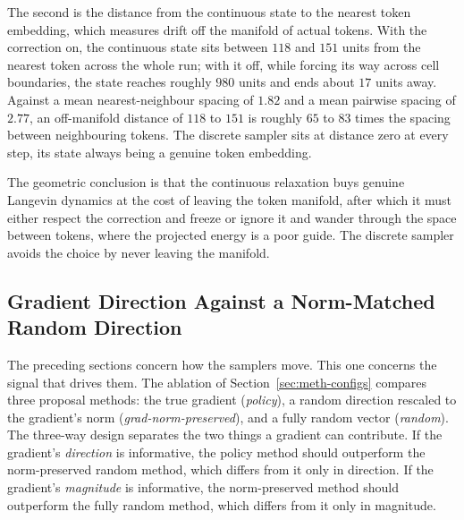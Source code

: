 The second is the distance from the continuous state to the nearest token embedding, which measures drift off the manifold of actual tokens. With the correction on, the continuous state sits between $118$ and $151$ units from the nearest token across the whole run; with it off, while forcing its way across cell boundaries, the state reaches roughly $980$ units and ends about $17$ units away.
Against a mean nearest-neighbour spacing of $1.82$ and a mean pairwise spacing of $2.77$, an off-manifold distance of $118$ to $151$ is roughly $65$ to $83$ times the spacing between neighbouring tokens. The discrete sampler sits at distance zero at every step, its state always being a genuine token embedding.

The geometric conclusion is that the continuous relaxation buys genuine Langevin dynamics at the cost of leaving the token manifold, after which it must either respect the correction and freeze or ignore it and wander through the space between tokens, where the projected energy is a poor guide. The discrete sampler avoids the choice by never leaving the manifold.

\subsection{Gradient Direction Against a Norm-Matched Random Direction}
\label{sec:results-fallacy}

The preceding sections concern how the samplers move. This one concerns the signal that drives them. The ablation of Section~\ref{sec:meth-configs} compares three proposal methods: the true gradient (\emph{policy}), a random direction rescaled to the gradient's norm (\emph{grad-norm-preserved}), and a fully random vector (\emph{random}). The three-way design separates the two things a gradient can contribute. If the gradient's \emph{direction} is informative, the policy method should outperform the norm-preserved random method, which differs from it only in direction. If the gradient's \emph{magnitude} is informative, the norm-preserved method should outperform the fully random method, which differs from it only in magnitude.

